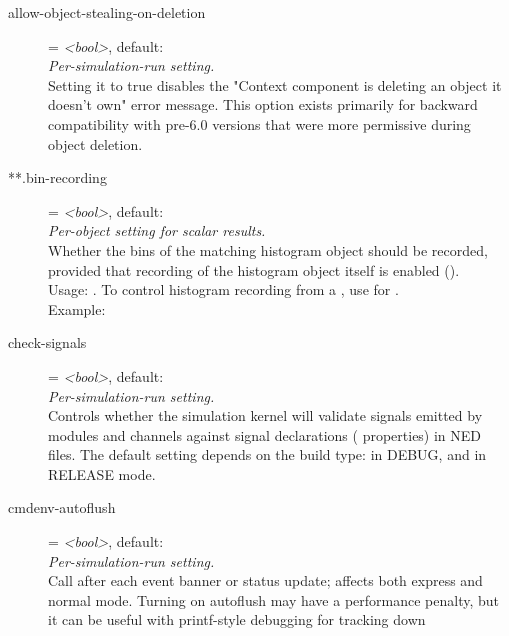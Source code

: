 \begin{description}
\item[allow-object-stealing-on-deletion] = \textit{<bool>}, default: \\
    \textit{Per-simulation-run setting.}\\
    Setting it to true disables the "Context component is deleting an object it
    doesn't own" error message. This option exists primarily for backward
    compatibility with pre-6.0 versions that were more permissive during object
    deletion.
\item[**.bin-recording] = \textit{<bool>}, default: \\
    \textit{Per-object setting for scalar results.}\\
    Whether the bins of the matching histogram object should be recorded,
    provided that recording of the histogram object itself is enabled
    ().\\
    Usage:
    .
    To control histogram recording from a , use
     for
    .\\
    Example:
\item[check-signals] = \textit{<bool>}, default: \\
    \textit{Per-simulation-run setting.}\\
    Controls whether the simulation kernel will validate signals emitted by
    modules and channels against signal declarations
    ( properties) in NED files. The default setting
    depends on the build type:  in DEBUG, and  in RELEASE
    mode.
\item[cmdenv-autoflush] = \textit{<bool>}, default: \\
    \textit{Per-simulation-run setting.}\\
    Call  after each event banner or status update; affects
    both express and normal mode. Turning on autoflush may have a performance
    penalty, but it can be useful with printf-style debugging for tracking down

\end{description}
